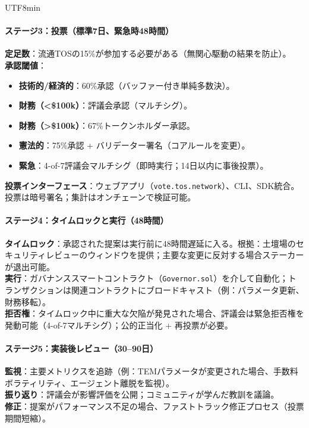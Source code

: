 \documentclass[11pt]{article}
\begin{document}
\begin{CJK}{UTF8}{min}
\begin{itemize}[noitemsep]
\paragraph{ステージ3：投票（標準7日、緊急時48時間）}
\textbf{定足数}：流通TOSの15\%が参加する必要がある（無関心駆動の結果を防止）。\\
\textbf{承認閾値}：
\begin{itemize}[noitemsep]
  \item \textbf{技術的/経済的}：60\%承認（バッファー付き単純多数決）。
  \item \textbf{財務（<\$100k）}：評議会承認（マルチシグ）。
  \item \textbf{財務（>\$100k）}：67\%トークンホルダー承認。
  \item \textbf{憲法的}：75\%承認 + バリデーター署名（コアルールを変更）。
  \item \textbf{緊急}：4-of-7評議会マルチシグ（即時実行；14日以内に事後投票）。
\end{itemize}
\textbf{投票インターフェース}：ウェブアプリ（\texttt{vote.tos.network}）、CLI、SDK統合。投票は暗号署名；集計はオンチェーンで検証可能。

\paragraph{ステージ4：タイムロックと実行（48時間）}
\textbf{タイムロック}：承認された提案は実行前に48時間遅延に入る。根拠：土壇場のセキュリティレビューのウィンドウを提供；主要な変更に反対する場合ステーカーが退出可能。\\
\textbf{実行}：ガバナンススマートコントラクト（\texttt{Governor.sol}）を介して自動化；トランザクションは関連コントラクトにブロードキャスト（例：パラメータ更新、財務移転）。\\
\textbf{拒否権}：タイムロック中に重大な欠陥が発見された場合、評議会は緊急拒否権を発動可能（4-of-7マルチシグ）；公的正当化 + 再投票が必要。

\paragraph{ステージ5：実装後レビュー（30--90日）}
\textbf{監視}：主要メトリクスを追跡（例：TEMパラメータが変更された場合、手数料ボラティリティ、エージェント離脱を監視）。\\
\textbf{振り返り}：評議会が影響評価を公開；コミュニティが学んだ教訓を議論。\\
\textbf{修正}：提案がパフォーマンス不足の場合、ファストトラック修正プロセス（投票期間短縮）。


\end{itemize}
\end{CJK}
\end{document}
